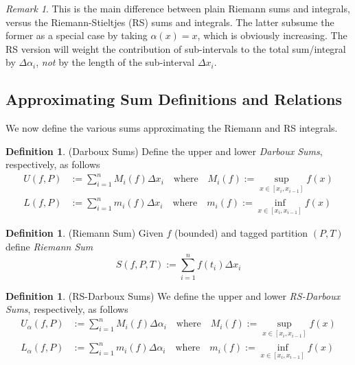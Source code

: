 \documentclass[12pt]{article}
\numberwithin{equation}{section} %
\theoremstyle{plain}
\theoremstyle{definition}
\newtheorem{defn}[thm]{Definition}
\theoremstyle{remark}
\newtheorem*{rmk}{Remark}
\begin{document}
\begin{rmk}
This is the main difference between plain Riemann sums and integrals,
versus the Riemann-Stieltjes (RS) sums and integrals.
The latter subsume the former as a special case by taking
$\alpha(x) = x$, which is obviously increasing.
The RS version will weight the contribution of sub-intervals to the
total sum/integral by $\Delta\alpha_i$, \emph{not} by the length of the
sub-interval $\Delta x_i$.
\end{rmk}

\subsection{Approximating Sum Definitions and Relations}

We now define the various sums approximating the Riemann and RS
integrals.

\begin{defn}(Darboux Sums)
Define the upper and lower \emph{Darboux Sums}, respectively, as follows
\begin{align*}
    U(f,P) &:= \sum^n_{i=1} M_i(f)\Delta x_i
        \quad\text{where} \quad
        M_i(f) := \sup_{x \in [x_i, x_{i-1}]} f(x)\\
    L(f,P) &:= \sum^n_{i=1} m_i(f)\Delta x_i
        \quad\text{where} \quad
        m_i(f) := \inf_{x \in [x_i, x_{i-1}]} f(x)
\end{align*}
\end{defn}

\begin{defn}(Riemann Sum)
Given $f$ (bounded) and tagged partition $(P,T)$ define
\emph{Riemann Sum}
\begin{equation}
    S(f,P,T) := \sum^n_{i=1} f(t_i) \Delta x_i
\end{equation}
\end{defn}

\begin{defn}(RS-Darboux Sums)
\label{RSD}
We define the upper and lower \emph{RS-Darboux Sums}, respectively, as
follows
\begin{align*}
    U_\alpha(f,P) &:= \sum^n_{i=1} M_i(f) \Delta \alpha_i
        \quad\text{where} \quad
        M_i(f) := \sup_{x \in [x_i, x_{i-1}]} f(x) \\
    L_\alpha(f,P) &:= \sum^n_{i=1} m_i(f)\Delta \alpha_i
        \quad\text{where} \quad
        m_i(f) := \inf_{x \in [x_i, x_{i-1}]} f(x)
\end{align*}
\end{defn}
\end{document}
